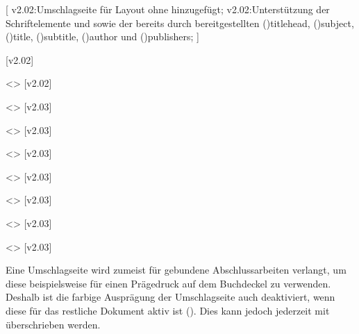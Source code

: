 \begin{DeclareEntity*}{}
\begin{DeclareEntity*}{}
\begin{DeclareEntity*}{}
\begin{Declaration}
  {}
  [
    v2.02:Umschlagseite für Layout ohne \CD hinzugefügt;
    v2.02:Unterstützung der Schriftelemente  und 
      sowie der bereits durch \KOMAScript bereitgestellten 
      \Font*(){titlehead}, 
      \Font*(){subject}, 
      \Font*(){title}, 
      \Font*(){subtitle}, 
      \Font*(){author} und
      \Font*(){publishers};
  ]
\begin{Declaration}
  {}
  [v2.02]
\begin{Declaration}
  {}
\begin{Declaration}
  {}
  <>
  [v2.02]
\begin{Declaration}
  {}
  <>
  [v2.03]
\begin{Declaration}
  {}
  <>
  [v2.03]
\begin{Declaration}
  {}
  <>
  [v2.03]
\begin{Declaration}
  {}
  <>
  [v2.03]
\begin{Declaration}
  {}
  <>
  [v2.03]
\begin{Declaration}
  {}
  <>
  [v2.03]
\begin{Declaration}
  {}
  <>
  [v2.03]
\printdeclarationlist[Umschlagseite|!]

Eine Umschlagseite wird zumeist für gebundene Abschlussarbeiten verlangt, um 
diese beispielsweise für einen Prägedruck auf dem Buchdeckel zu verwenden. 
Deshalb ist die farbige Ausprägung der Umschlagseite auch deaktiviert, wenn 
diese für das restliche Dokument aktiv ist (). Dies kann 
jedoch jederzeit mit  überschrieben werden.


\end{Declaration}
\end{Declaration}
\end{Declaration}
\end{Declaration}
\end{Declaration}
\end{Declaration}
\end{Declaration}
\end{Declaration}
\end{Declaration}
\end{Declaration}
\end{Declaration}
\end{DeclareEntity*}
\end{DeclareEntity*}
\end{DeclareEntity*}
